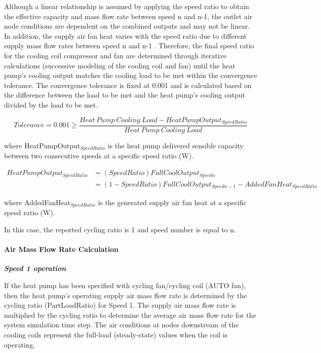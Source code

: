Although a linear relationship is assumed by applying the speed ratio to obtain the effective capacity and mass flow rate between speed n and n-1, the outlet air node conditions are dependent on the combined outputs and may not be linear. In addition, the supply air fan heat varies with the speed ratio due to different supply mass flow rates between speed n and n-1 . Therefore, the final speed ratio for the cooling coil compressor and fan are determined through iterative calculations (successive modeling of the cooling coil and fan) until the heat pump's cooling output matches the cooling load to be met within the convergence tolerance. The convergence tolerance is fixed at 0.001 and is calculated based on the difference between the load to be met and the heat pump's cooling output divided by the load to be met.

\begin{equation}
Tolerance = 0.001 \ge \frac{{Heat~Pump~Cooling~Load - HeatPumpOutpu{t_{SpeedRatio}}}}{{Heat~Pump~Cooling~Load}}
\end{equation}

where HeatPumpOutput\(_{SpeedRatio}\) is the heat pump delivered sensible capacity between two consecutive speeds at a specific speed ratio (W).

\begin{equation}
\begin{array}{rl}
HeatPumpOutpu{t_{SpeedRatio}} & = (SpeedRatio)FullCoolOutpu{t_{Speedn}} \\
 & = (1 - SpeedRatio)FullCoolOutpu{t_{Speedn-1}} - AddedFanHea{t_{SpeedRatio}}
\end{array}
\end{equation}

where AddedFanHeat\(_{SpeedRatio}\) is the generated supply air fan heat at a specific speed ratio (W).

In this case, the reported cycling ratio is 1 and speed number is equal to n.

\paragraph{Air Mass Flow Rate Calculation}\label{air-mass-flow-rate-calculation-2}

\emph{\textbf{Speed 1 operation}}

If the heat pump has been specified with cycling fan/cycling coil (AUTO fan), then the heat pump's operating supply air mass flow rate is determined by the cycling ratio (PartLoadRatio) for Speed 1. The supply air mass flow rate is multiplied by the cycling ratio to determine the average air mass flow rate for the system simulation time step. The air conditions at nodes downstream of the cooling coils represent the full-load (steady-state) values when the coil is operating.

